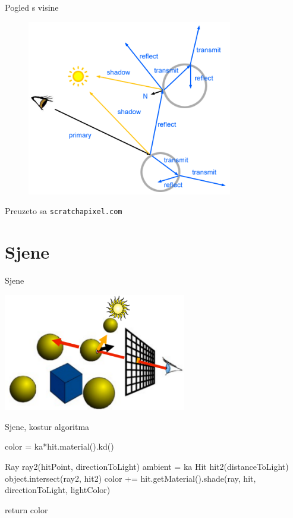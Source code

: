 \documentclass[9pt]{beamer}
\begin{document}
\begin{frame}{Pogled s visine}
\begin{figure}
	\includegraphics[width=0.8\textwidth]{./slike/rt-recursive}
\end{figure}
\tiny{Preuzeto sa \texttt{scratchapixel.com}}
\end{frame}

\section{Sjene}

\begin{frame}{Sjene}
\begin{center}
	\includegraphics[width=8cm]{slike/sjene_01.png}
\end{center}

\end{frame}

\begin{frame}{Sjene, kostur algoritma}
\begin{algorithm*}[H]
color = ka*hit.material().kd()\;
{
	Ray ray2(hitPoint, directionToLight)\;
	ambient = ka\;
	Hit hit2(distanceToLight)\;
	{
		object.intersect(ray2, hit2)\;
		{
			color += hit.getMaterial().shade(ray, hit, directionToLight, lightColor)\;
		}
	}
	
}
return color\;
\end{algorithm*}
\end{frame}
\end{document}
